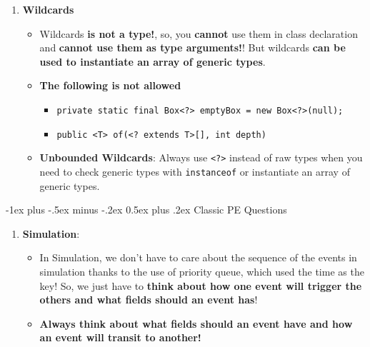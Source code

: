 \documentclass[10pt, landscape]{article}
\makeatletter
\renewcommand{\section}{\@startsection{section}{1}{0mm}%
                                {-1ex plus -.5ex minus -.2ex}%
                                {0.5ex plus .2ex}%
                                {\normalfont\large\bfseries}}
\makeatother
\begin{document}
\begin{multicols}{4}
\begin{enumerate}
\begin{itemize}
    \end{itemize}
    \item \textbf{Wildcards}
    \begin{itemize}
        \item Wildcards \textbf{is not a type!}, so, you \textbf{cannot} use them in class declaration and \textbf{cannot use them as type arguments!}! But wildcards \textbf{can be used to instantiate an array of generic types}.
        \item \textbf{The following is not allowed}
        \begin{itemize}
            \item \texttt{private static final Box<?> emptyBox = new Box<?>(null);}
            \item \texttt{public <T> of(<? extends T>[], int depth) {}}
        \end{itemize}
        \item \textbf{Unbounded Wildcards}: Always use \texttt{<?>} instead of raw types when you need to check generic types with \texttt{instanceof} or instantiate an array of generic types.
    \end{itemize}
\end{enumerate}

\section{Classic PE Questions}
\begin{enumerate}
    \item \textbf{Simulation}:
    \begin{itemize}
        \item In Simulation, we don't have to care about the sequence of the events in simulation thanks to the use of priority queue, which used the time as the key! So, we just have to \textbf{think about how one event will trigger the others and what fields should an event has}!
        \item \textbf{Always think about what fields should an event have and how an event will transit to another!}
    \end{itemize} 
\end{enumerate}
\end{multicols}
\end{document}
